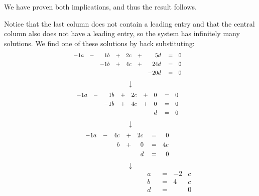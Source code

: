 \documentclass[12pt]{article}
\newenvironment{problem}[2][Problem]
{
	\begin{trivlist} 
		\item[\hskip \labelsep {\bfseries #1 #2:}]
	}
{
	\end{trivlist}
	}
\newenvironment{solution}[1][Solution]
{
	\begin{trivlist} 
		\item[\hskip \labelsep {\itshape #1:}]
	}
	{
	\end{trivlist}
}
\begin{document}
\begin{problem}{6}
\begin{solution}
We have proven both implications, and thus the result follows.
\end{solution}
%
%
%
\newpage
Notice that the last column does not contain a leading entry and that the central column also does not have a leading entry, so the system has infinitely many solutions. We find one of these solutions by back substituting:
\begin{align*}
&&&&&&&& &&&&&&&& &&&&&&&& -1&a& &-& 1&b& &+& 2&c& &+& 5&d& &=& &0& &&&&&&&& &&&&&&&& &&&&&&&&\\
&&&&&&&& &&&&&&&& &&&&&&&& &\hphantom{1}& &\hphantom{1}& -1&b& &+& 4&c& &+& 24&d& &=& &0& &&&&&&&& &&&&&&&& &&&&&&&&\\
&&&&&&&& &&&&&&&& &&&&&&&& &\hphantom{1}& &\hphantom{1}& &\hphantom{1}& &\hphantom{1}& &\hphantom{1}& &\hphantom{1}& -20&d& &=& &0& &&&&&&&& &&&&&&&& &&&&&&&&
\end{align*}
\[
\downarrow
\]
\begin{align*}
&&&&&&&& &&&&&&&& &&&&&&&& -1&a& &-& 1&b& &+& 2&c& &+& &0& &=& &0& &&&&&&&& &&&&&&&& &&&&&&&&\\
&&&&&&&& &&&&&&&& &&&&&&&& &\hphantom{1}& &\hphantom{1}& -1&b& &+& 4&c& &+& &0& &=& &0& &&&&&&&& &&&&&&&& &&&&&&&&\\
&&&&&&&& &&&&&&&& &&&&&&&& &\hphantom{1}& &\hphantom{1}& &\hphantom{1}& &\hphantom{1}& &\hphantom{1}& &\hphantom{1}& &d& &=& &0& &&&&&&&& &&&&&&&& &&&&&&&&
\end{align*}
\[
\downarrow
\]
\begin{align*}
&&&&&&&& &&&&&&&& &&&&&&&& && -1&a& &-& 4&c& &+& 2&c& &=& &0& && &&&&&&&& &&&&&&&& &&&&&&&&\\
&&&&&&&& &&&&&&&& &&&&&&&& && &\hphantom{1}& &\hphantom{1}& &b& &+& &0& &=& 4&c& && &&&&&&&& &&&&&&&& &&&&&&&&\\
&&&&&&&& &&&&&&&& &&&&&&&& && &\hphantom{1}& &\hphantom{1}& &\hphantom{1}& &\hphantom{1}& &d& &=& &0& && &&&&&&&& &&&&&&&& &&&&&&&&
\end{align*}
\[
\downarrow
\]
\begin{align*}
&&&&&&&& &&&&&&&& &&&&&&&& &a& &=& -2&c& &&&&&&&& &&&&&&&& &&&&&&&&\\
&&&&&&&& &&&&&&&& &&&&&&&& &b& &=& 4&c& &&&&&&&& &&&&&&&& &&&&&&&&\\
&&&&&&&& &&&&&&&& &&&&&&&& &d& &=& &0& &&&&&&&& &&&&&&&& &&&&&&&&
\end{align*}

\end{problem}
\end{document}
